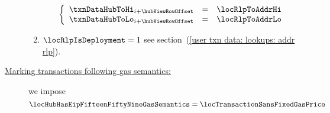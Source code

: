 \begin{description}
\begin{enumerate}
				\[
					\left\{ \begin{array}{lcl}
						\txnDataHubToHi _{i + \hubViewRowOffset} & = & \locRlpToAddrHi \\
						\txnDataHubToLo _{i + \hubViewRowOffset} & = & \locRlpToAddrLo \\
					\end{array} \right.
				\]
			\item
				\If $\locRlpIsDeployment = 1$ \Then see
				section~(\ref{user txn data: lookups: addr rlp}).
		\end{enumerate}
	\item[\underline{Marking transactions following \cite{EIP-1559} gas semantics:}]
		we impose
		\[
			\locHubHasEipFifteenFiftyNineGasSemantics
			=
			\locTransactionSansFixedGasPrice
		\]
\end{description}

